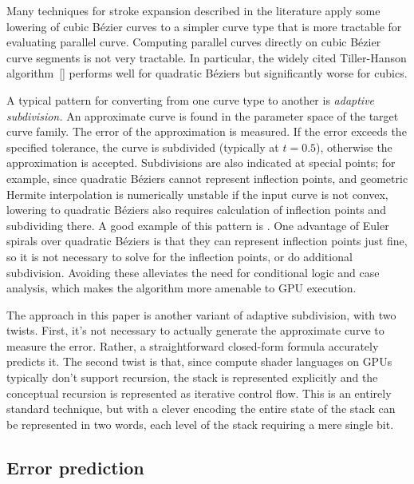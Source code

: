 \documentclass[sigconf, nonacm]{acmart}
\begin{document}
Many techniques for stroke expansion described in the literature apply some lowering of cubic Bézier curves to a simpler curve type that is more tractable for evaluating parallel curve. Computing parallel curves directly on cubic Bézier curve segments is not very tractable. In particular, the widely cited Tiller-Hanson algorithm~[] performs well for quadratic Béziers but significantly worse for cubics.


A typical pattern for converting from one curve type to another is \emph{adaptive subdivision.} An approximate curve is found in the parameter space of the target curve family. The error of the approximation is measured. If the error exceeds the specified tolerance, the curve is subdivided (typically at $t = 0.5$), otherwise the approximation is accepted. Subdivisions are also indicated at special points; for example, since quadratic Béziers cannot represent inflection points, and geometric Hermite interpolation is numerically unstable if the input curve is not convex, lowering to quadratic Béziers also requires calculation of inflection points and subdividing there. A good example of this pattern is \citet{Nehab2020}. One advantage of Euler spirals over quadratic Béziers is that they can represent inflection points just fine, so it is not necessary to solve for the inflection points, or do additional subdivision. Avoiding these alleviates the need for conditional logic and case analysis, which makes the algorithm more amenable to GPU execution.

The approach in this paper is another variant of adaptive subdivision, with two twists. First, it's not necessary to actually generate the approximate curve to measure the error. Rather, a straightforward closed-form formula accurately predicts it. The second twist is that, since compute shader languages on GPUs typically don't support recursion, the stack is represented explicitly and the conceptual recursion is represented as iterative control flow. This is an entirely standard technique, but with a clever encoding the entire state of the stack can be represented in two words, each level of the stack requiring a mere single bit.

\subsection{Error prediction}
\end{document}
